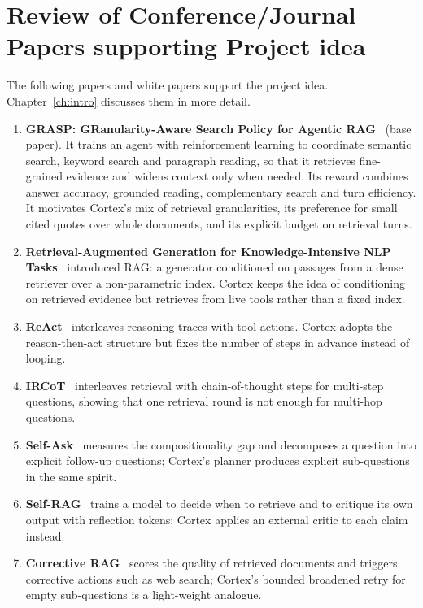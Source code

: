 \documentclass[oneside,a4paper,12pt]{report}
\begin{document}
\section{Review of Conference/Journal Papers supporting Project idea}
\label{sec:survey}
The following papers and white papers support the project idea. Chapter~\ref{ch:intro} discusses them in more detail.
\begin{enumerate}
\item \textbf{GRASP: GRanularity-Aware Search Policy for Agentic RAG}~\cite{grasp2026} (base paper). It trains an agent with reinforcement learning to coordinate semantic search, keyword search and paragraph reading, so that it retrieves fine-grained evidence and widens context only when needed. Its reward combines answer accuracy, grounded reading, complementary search and turn efficiency. It motivates Cortex's mix of retrieval granularities, its preference for small cited quotes over whole documents, and its explicit budget on retrieval turns.
\item \textbf{Retrieval-Augmented Generation for Knowledge-Intensive NLP Tasks}~\cite{lewis2020rag} introduced RAG: a generator conditioned on passages from a dense retriever over a non-parametric index. Cortex keeps the idea of conditioning on retrieved evidence but retrieves from live tools rather than a fixed index.
\item \textbf{ReAct}~\cite{yao2023react} interleaves reasoning traces with tool actions. Cortex adopts the reason-then-act structure but fixes the number of steps in advance instead of looping.
\item \textbf{IRCoT}~\cite{trivedi2023ircot} interleaves retrieval with chain-of-thought steps for multi-step questions, showing that one retrieval round is not enough for multi-hop questions.
\item \textbf{Self-Ask}~\cite{press2023selfask} measures the compositionality gap and decomposes a question into explicit follow-up questions; Cortex's planner produces explicit sub-questions in the same spirit.
\item \textbf{Self-RAG}~\cite{asai2024selfrag} trains a model to decide when to retrieve and to critique its own output with reflection tokens; Cortex applies an external critic to each claim instead.
\item \textbf{Corrective RAG}~\cite{yan2024crag} scores the quality of retrieved documents and triggers corrective actions such as web search; Cortex's bounded broadened retry for empty sub-questions is a light-weight analogue.

\end{enumerate}
\end{document}
